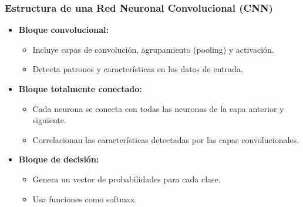 
\begin{frame}
    \frametitle{Estructura de una Red Neuronal Convolucional (CNN)}

    \begin{itemize}[leftmargin=*]
        \item \textbf{Bloque convolucional:}
        \begin{itemize}[leftmargin=*]
            \item Incluye capas de convolución, agrupamiento (pooling) y activación.
            \item Detecta patrones y características en los datos de entrada.
        \end{itemize}

        \item \textbf{Bloque totalmente conectado:}
        \begin{itemize}[leftmargin=*]
            \item Cada neurona se conecta con todas las neuronas de la capa anterior y siguiente.
            \item Correlacionan las características detectadas por las capas convolucionales.
        \end{itemize}

        \item \textbf{Bloque de decisión:}
        \begin{itemize}[leftmargin=*]
            \item Genera un vector de probabilidades para cada clase.
            \item Usa funciones como softmax.
        \end{itemize}
    \end{itemize}

\end{frame}


